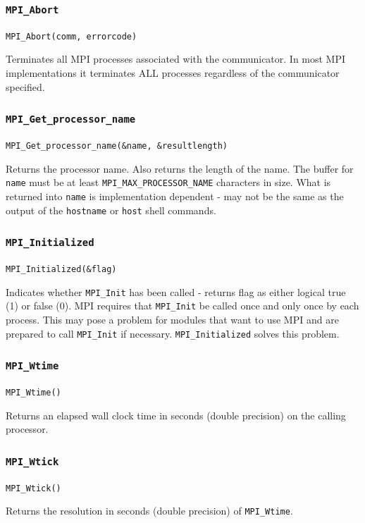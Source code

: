 \subsubsection{\texttt{MPI\_Abort}}
\texttt{MPI\_Abort(comm, errorcode)}

Terminates all MPI processes associated with the communicator. In most MPI implementations it terminates ALL processes regardless of the communicator specified. 

\subsubsection{\texttt{MPI\_Get\_processor\_name}}
\texttt{MPI\_Get\_processor\_name(\&name, \&resultlength) }

Returns the processor name. Also returns the length of the name. The buffer for \texttt{name} 
must be at least \texttt{MPI\_MAX\_PROCESSOR\_NAME} characters in size. What is returned into 
\texttt{name} is implementation dependent - may not be the same as the output of the 
\texttt{hostname} or \texttt{host} shell commands. 

\subsubsection{\texttt{MPI\_Initialized}}
\texttt{MPI\_Initialized(\&flag) }

Indicates whether \texttt{MPI\_Init} has been called - returns flag as either logical true (1) or false (0). MPI requires that \texttt{MPI\_Init} be called once and only once by each process. This may pose a problem for modules that want to use MPI and are prepared to call \texttt{MPI\_Init} if necessary. \texttt{MPI\_Initialized} solves this problem. 

\subsubsection{\texttt{MPI\_Wtime}}
\texttt{MPI\_Wtime()}

Returns an elapsed wall clock time in seconds (double precision) on the calling processor. 

\subsubsection{\texttt{MPI\_Wtick}}
\texttt{MPI\_Wtick()}

Returns the resolution in seconds (double precision) of \texttt{MPI\_Wtime}. 

